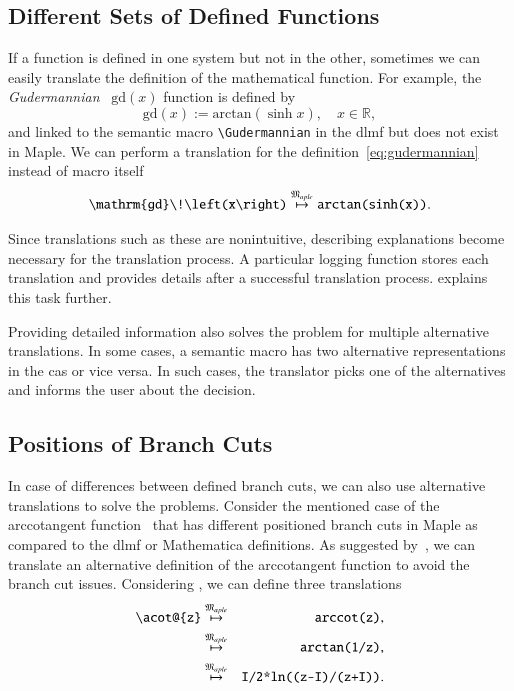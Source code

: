 \documentclass[a4paper,11pt]{article}
\newcommand{\Maple}{Maple}
\newcommand{\Mathematica}{Mathematica}
\newcommand{\langMaple}{\mathfrak{M}_{aple}}
\theoremstyle{defTheoStyle}
\theoremstyle{defExampStyle}
\DeclareRobustCommand{\Real}{\mathbb{R}}
\newcommand{\Gudermannian}[1]{\mathrm{gd}\!\left(#1\right)}
\newcommand{\atan}[1]{\mathrm{arctan}\!\left(#1\right)}
\begin{document}
	\subsection{Different Sets of Defined Functions}
	If a function is defined in one system but not in the other, sometimes we can easily translate the definition of the mathematical function. For example, the \textit{Gudermannian}~\parencite[(4.23.10)]{NIST:DLMF} $\Gudermannian{x}$ function is defined by
	\begin{equation}\label{eq:gudermannian}
	\Gudermannian{x} := \atan{\sinh{x}}, \quad x \in \Real,
	\end{equation}
	and linked to the semantic macro \verb|\Gudermannian| in the \gls*{dlmf} but does not exist in \Maple. We can perform a translation for the definition~\eqref{eq:gudermannian} instead of macro itself
	\begin{equation}\label{eq:guder-trans}
	\verb|\Gudermannian{x}| \overset{\langMaple}{\mapsto} \texttt{arctan(sinh(x))}.
	\end{equation}
	
	\vspace{-0.2cm}
	Since translations such as these are nonintuitive, describing explanations become necessary for the translation process. A particular logging function stores each translation and provides details after a successful translation process.  explains this task further.
	
	Providing detailed information also solves the problem for multiple alternative translations. In some cases, a semantic macro has two alternative representations in the \gls*{cas} or vice versa. In such cases, the translator picks one of the alternatives and informs the user about the decision.
	
	\subsection{Positions of Branch Cuts}
	In case of differences between defined branch cuts, we can also use alternative translations to solve the problems. Consider the mentioned case of the arccotangent function~\parencite{Branches:acot} that has different positioned branch cuts in \Maple{} as compared to the \gls*{dlmf} or \Mathematica{} definitions. As suggested by~\parencite{Branches:acot}, we can translate an alternative definition of the arccotangent function to avoid the branch cut issues. Considering 
	\parencite[(23), (25)]{Branches:acot}, we can define three translations
	\begin{eqnarray}
	\verb|\acot@{z}| & \overset{\langMaple}{\mapsto} & \verb|arccot(z)|,\label{eq:acot-alternatives}\\
	& \overset{\langMaple}{\mapsto} & \verb|arctan(1/z)|,\label{eq:acot-alternatives-1}\\
	& \overset{\langMaple}{\mapsto} & \verb|I/2*ln((z-I)/(z+I))|.\label{eq:acot-alternatives-2}
	\end{eqnarray}
	
\end{document}

